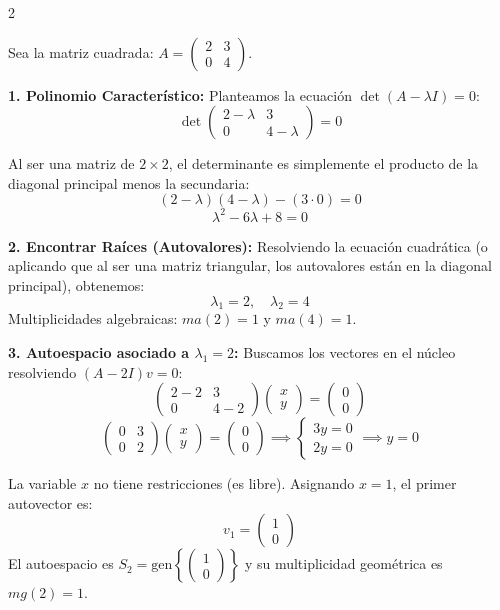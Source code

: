 \documentclass[10pt]{extarticle}
\begin{document}
\begin{multicols}{2}

Sea la matriz cuadrada: $A = \begin{pmatrix} 2 & 3 \\ 0 & 4 \end{pmatrix}$.

\textbf{1. Polinomio Característico:}
Planteamos la ecuación $\det(A - \lambda I) = 0$:
$$\det\begin{pmatrix} 2-\lambda & 3 \\ 0 & 4-\lambda \end{pmatrix} = 0$$

Al ser una matriz de $2 \times 2$, el determinante es simplemente el producto de la diagonal principal menos la secundaria:
$$(2 - \lambda)(4 - \lambda) - (3 \cdot 0) = 0$$
$$\lambda^2 - 6\lambda + 8 = 0$$

\textbf{2. Encontrar Raíces (Autovalores):}
Resolviendo la ecuación cuadrática (o aplicando que al ser una matriz triangular, los autovalores están en la diagonal principal), obtenemos:
$$\lambda_1 = 2, \quad \lambda_2 = 4$$
Multiplicidades algebraicas: $ma(2) = 1$ y $ma(4) = 1$.

\textbf{3. Autoespacio asociado a $\lambda_1 = 2$:}
Buscamos los vectores en el núcleo resolviendo $(A - 2I)v = 0$:
$$\begin{pmatrix} 2-2 & 3 \\ 0 & 4-2 \end{pmatrix} \begin{pmatrix} x \\ y \end{pmatrix} = \begin{pmatrix} 0 \\ 0 \end{pmatrix}$$
$$\begin{pmatrix} 0 & 3 \\ 0 & 2 \end{pmatrix} \begin{pmatrix} x \\ y \end{pmatrix} = \begin{pmatrix} 0 \\ 0 \end{pmatrix} \implies \begin{cases} 3y = 0 \\ 2y = 0 \end{cases} \implies y = 0$$

La variable $x$ no tiene restricciones (es libre). Asignando $x = 1$, el primer autovector es:
$$v_1 = \begin{pmatrix} 1 \\ 0 \end{pmatrix}$$
El autoespacio es $S_{2} = \text{gen}\left\{\begin{pmatrix} 1 \\ 0 \end{pmatrix}\right\}$ y su multiplicidad geométrica es $mg(2) = 1$.


\end{multicols}
\end{document}
